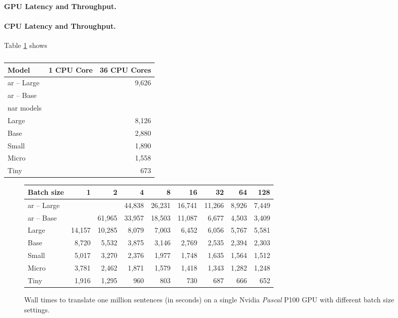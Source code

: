 \paragraph{GPU Latency and Throughput.}



\paragraph{CPU Latency and Throughput.}
Table \ref{tab:exp:cpu} shows



\begin{table}
  \centering

  \begin{tabular}{lrr}
    \toprule
    Model & 1 CPU Core & 36 CPU Cores \\
    \midrule
    \acs{ar} -- Large & & 9,626 \\
    \acs{ar} -- Base & & \\
    \midrule
    \Acl{nar} models \\
    Large & & 8,126 \\
    Base  & & 2,880 \\
    Small & & 1,890 \\
    Micro & & 1,558 \\
    Tiny  & &   673 \\
    \bottomrule
  \end{tabular}

  \caption{}%
  \label{tab:exp:cpu}
\end{table}



\begin{figure}
  \centering

  
  \vspace{1\baselineskip}

  \begin{tabular}{lrrrrrrrr}
    \toprule
    Batch size & 1 & 2 & 4 & 8 & 16 & 32 & 64 & 128\\
    \midrule
    \acs{ar} -- Large &&        & 44,838 & 26,231 & 16,741 & 11,266 & 8,926 & 7,449 \\
    \acs{ar} -- Base  && 61,965 & 33,957 & 18,503 & 11,087 &  6,677 & 4,503 & 3,409 \\
    \midrule
    Large & 14,157 & 10,285 & 8,079 & 7,003 & 6,452 & 6,056 & 5,767 & 5,581 \\
    Base  &  8,720 &  5,532 & 3,875 & 3,146 & 2,769 & 2,535 & 2,394 & 2,303 \\
    Small &  5,017 &  3,270 & 2,376 & 1,977 & 1,748 & 1,635 & 1,564 & 1,512 \\
    Micro &  3,781 &  2,462 & 1,871 & 1,579 & 1,418 & 1,343 & 1,282 & 1,248 \\
    Tiny  &  1,916 &  1,295 &   960 &   803 &   730 &   687 &   666 &   652 \\
    \bottomrule
  \end{tabular}

  \caption{Wall times to translate one million sentences (in seconds) on a
    single Nvidia \emph{Pascal} P100 GPU with different batch size settings.}%
  \label{fig:throughput:p100}
\end{figure}


